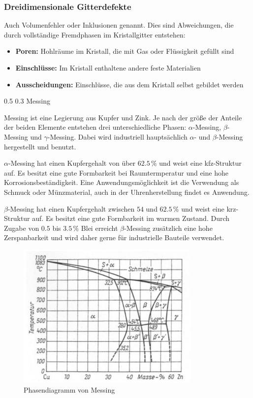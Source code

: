 \documentclass[german, %
parskip=full, %
bibliography=totoc, %
]{scrartcl}
\makeatletter
\renewcommand\subsection{\@startsection 
   {subsection}{2}{0mm}%
   {0.5\baselineskip}%
   {0.3\baselineskip}%
   {\bfseries\sffamily\large}%
   }
\makeatother
\begin{document}
\subsubsection{Dreidimensionale Gitterdefekte}

Auch Volumenfehler oder Inklusionen genannt. Dies sind Abweichungen, die durch vollständige Fremdphasen im Kristallgitter entstehen:
\begin{itemize}
\item \textbf{Poren:} Hohlräume im Kristall, die mit Gas oder Flüssigkeit gefüllt sind
\item \textbf{Einschlüsse:} Im Kristall enthaltene andere feste Materialien
\item \textbf{Ausscheidungen:} Einschlüsse, die aus dem Kristall selbst gebildet werden
\end{itemize}

\subsection{Messing}

Messing ist eine Legierung aus Kupfer und Zink. Je nach der größe der Anteile der beiden Elemente entstehen drei unterschiedliche Phasen: $\alpha$-Messing, $\beta$-Messing und $\gamma$-Messing. Dabei wird industriell hauptsächlich $\alpha$- und $\beta$-Messing hergestellt und benutzt.

$\alpha$-Messing hat einen Kupfergehalt von über $62.5\,\%$ und weist eine kfz-Struktur auf. Es besitzt eine gute Formbarkeit bei Raumtermperatur und eine hohe Korrosionsbeständigkeit. Eine Anwendungsmöglichkeit ist die Verwendung als Schmuck oder Münzmaterial, auch in der Uhrenherstellung findet es Anwendung. \cite{messing}

$\beta$-Messing hat einen Kupfergehalt zwischen $54$ und $62.5\,\%$ und weist eine krz-Struktur auf. Es besitzt eine gute Formbarkeit im warmen Zustand. Durch Zugabe von $0.5$ bis $3.5\,\%$ Blei erreicht $\beta$-Messing zusätzlich eine hohe Zerspanbarkeit und wird daher gerne für industrielle Bauteile verwendet.

\begin{figure}[hb] 
  \centering
     \includegraphics[width=0.8\textwidth]{Messing_Phase}
  \caption{Phasendiagramm von Messing}
  \label{fig:phasemessing}
\end{figure}
\end{document}
